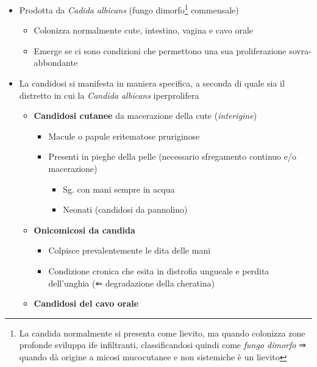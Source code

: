 \documentclass[italian,]{article}
\providecommand{\tightlist}{%
  \setlength{\itemsep}{0pt}\setlength{\parskip}{0pt}}
\begin{document}
\begin{itemize}
\tightlist
\item
  Prodotta da \emph{Cadida albicans} (fungo dimorfo\footnote{La candida
    normalmente si presenta come lievito, ma quando colonizza zone
    profonde sviluppa ife infiltranti, classificandosi quindi come
    \emph{fungo dimorfo} ⇒ quando dà origine a micosi mucocutanee e non
    sistemiche è un lievito} commensale)

  \begin{itemize}
  \tightlist
  \item
    Colonizza normalmente cute, intestino, vagina e cavo orale
  \item
    Emerge se ci sono condizioni che permettono una sua proliferazione
    sovra-abbondante
  \end{itemize}
\item
  La candidosi si manifesta in maniera specifica, a seconda di quale sia
  il distretto in cui la \emph{Candida albicans} iperprolifera

  \begin{itemize}
  \tightlist
  \item
    \textbf{Candidosi cutanee} da macerazione della cute
    (\emph{interigine})

    \begin{itemize}
    \tightlist
    \item
      Macule o papule eritematose pruriginose
    \item
      Presenti in pieghe della pelle (necessario sfregamento continuo
      e/o macerazione)

      \begin{itemize}
      \tightlist
      \item
        Sg. con mani sempre in acqua
      \item
        Neonati (candidosi da pannolino)
      \end{itemize}
    \end{itemize}
  \item
    \textbf{Onicomicosi da candida}

    \begin{itemize}
    \tightlist
    \item
      Colpisce prevalentemente le dita delle mani
    \item
      Condizione cronica che esita in distrofia ungueale e perdita
      dell'unghia (⇐ degradazione della cheratina)
    \end{itemize}
  \item
    \textbf{Candidosi del cavo orale}


\end{itemize}
\end{itemize}
\end{document}

